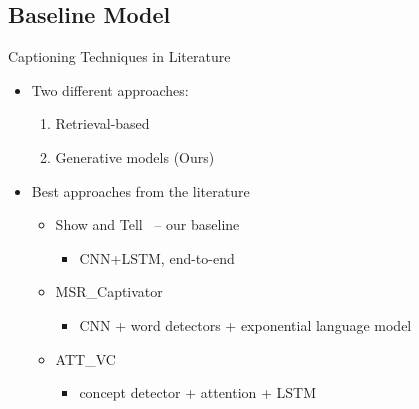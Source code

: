\documentclass{beamer}
\begin{document}
\subsection{Baseline Model}
\begin{frame}{Captioning Techniques in Literature}
\begin{itemize}
  \item Two different approaches:
      \begin{enumerate}
        \item Retrieval-based 
        \item Generative models (Ours)
      \end{enumerate}
  \item Best approaches from the literature
          \begin{itemize}
  \item Show and Tell~\cite{Vinyals_2015_CVPR} -- our baseline 
      \begin{itemize}
        \item CNN+LSTM, end-to-end 
      \end{itemize}
  \item MSR\_Captivator~\cite{Fang2015}
      \begin{itemize}
        \item CNN + word detectors + exponential language model
      \end{itemize}
  \item ATT\_VC~\cite{you2016image}
      \begin{itemize}
        \item concept detector + attention + LSTM 
      \end{itemize}
\end{itemize} 
\end{itemize} 
\end{frame}
\end{document}
